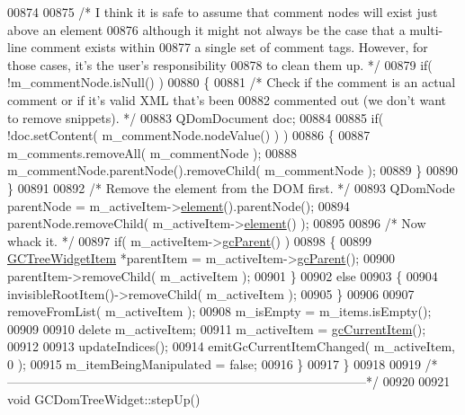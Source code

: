 \begin{DoxyCode}
00874 
00875     \textcolor{comment}{/* I think it is safe to assume that comment nodes will exist just above an
       element}
00876 \textcolor{comment}{      although it might not always be the case that a multi-line comment exists
       within}
00877 \textcolor{comment}{      a single set of comment tags.  However, for those cases, it's the user's
       responsibility}
00878 \textcolor{comment}{      to clean them up. */}
00879     \textcolor{keywordflow}{if}( !m\_commentNode.isNull() )
00880     \{
00881       \textcolor{comment}{/* Check if the comment is an actual comment or if it's valid XML that's
       been}
00882 \textcolor{comment}{        commented out (we don't want to remove snippets). */}
00883       QDomDocument doc;
00884 
00885       \textcolor{keywordflow}{if}( !doc.setContent( m\_commentNode.nodeValue() ) )
00886       \{
00887         m\_comments.removeAll( m\_commentNode );
00888         m\_commentNode.parentNode().removeChild( m\_commentNode );
00889       \}
00890     \}
00891 
00892     \textcolor{comment}{/* Remove the element from the DOM first. */}
00893     QDomNode parentNode = m\_activeItem->\hyperlink{class_g_c_tree_widget_item_a584cad866bdbd94710d31eb77b804d84}{element}().parentNode();
00894     parentNode.removeChild( m\_activeItem->\hyperlink{class_g_c_tree_widget_item_a584cad866bdbd94710d31eb77b804d84}{element}() );
00895 
00896     \textcolor{comment}{/* Now whack it. */}
00897     \textcolor{keywordflow}{if}( m\_activeItem->\hyperlink{class_g_c_tree_widget_item_a1125dbc55a8ba3e50662b8258cb35fdf}{gcParent}() )
00898     \{
00899       \hyperlink{class_g_c_tree_widget_item}{GCTreeWidgetItem} *parentItem = m\_activeItem->\hyperlink{class_g_c_tree_widget_item_a1125dbc55a8ba3e50662b8258cb35fdf}{gcParent}();
00900       parentItem->removeChild( m\_activeItem );
00901     \}
00902     \textcolor{keywordflow}{else}
00903     \{
00904       invisibleRootItem()->removeChild( m\_activeItem );
00905     \}
00906 
00907     removeFromList( m\_activeItem );
00908     m\_isEmpty = m\_items.isEmpty();
00909 
00910     \textcolor{keyword}{delete} m\_activeItem;
00911     m\_activeItem = \hyperlink{class_g_c_dom_tree_widget_a70d6a155777d375f3923c2d66e702d15}{gcCurrentItem}();
00912 
00913     updateIndices();
00914     emitGcCurrentItemChanged( m\_activeItem, 0 );
00915     m\_itemBeingManipulated = \textcolor{keyword}{false};
00916   \}
00917 \}
00918 
00919 \textcolor{comment}{/*
      --------------------------------------------------------------------------------------*/}
00920 
00921 \textcolor{keywordtype}{void} GCDomTreeWidget::stepUp()

\end{DoxyCode}
